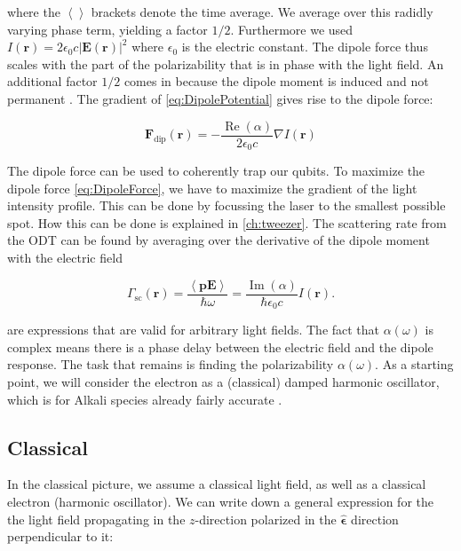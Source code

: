 where the $\left\langle\right\rangle$ brackets denote the time average.
We average over this radidly varying phase term, yielding a factor $1/2$.
Furthermore we used $I(\mathbf{r}) = 2 \epsilon_0 c |\mathbf{E}(\mathbf{r})|^2$ where $\epsilon_0$ is the electric constant. 
The dipole force thus scales with the part of the polarizability that is in phase with the light field.
An additional factor $1/2$ comes in because the dipole moment is induced and not permanent \cite{Grimm2000}. 
The gradient of \cref{eq:DipolePotential} gives rise to the dipole force:

\begin{equation}\label{eq:DipoleForce}
	\mathbf{F}_{\text{dip}}(\mathbf{r}) = - \frac{\operatorname{Re}(\alpha)}{2\epsilon_0c}\nabla I(\mathbf{r})
\end{equation}

The dipole force can be used to coherently trap our qubits. 
To maximize the dipole force \cref{eq:DipoleForce}, 
we have to maximize the gradient of the light intensity profile.
This can be done by focussing the laser to the smallest possible spot.
How this can be done is explained in \cref{ch:tweezer}. 
The scattering rate from the ODT can be found by averaging over the derivative of the dipole moment with the electric field \cite{Grimm2000}

\begin{equation}\label{eq:ScatteringRate}
	\Gamma_{\text{sc}}(\mathbf{r}) = \frac{\left\langle \mathbf{p} \mathbf{E} \right\rangle}{\hbar \omega}
	 = \frac{\operatorname{Im}(\alpha)}{\hbar \epsilon_0 c} I(\mathbf{r}).
\end{equation}

 are expressions that are valid for arbitrary light fields.
The fact that $\alpha(\omega)$ is complex means there is a phase delay between the electric field and the dipole response.
The task that remains is finding the polarizability $\alpha(\omega)$. 
As a starting point, we will consider the electron as a (classical) damped harmonic oscillator, which is for Alkali species already fairly accurate \cite{Grimm2000}.

\subsection{Classical}

In the classical picture, we assume a classical light field, as well as a classical electron (harmonic oscillator). 
We can write down a general expression for the the light field propagating in the $z$-direction polarized in the $\bm{\hat{\epsilon}}$ direction perpendicular to it:

